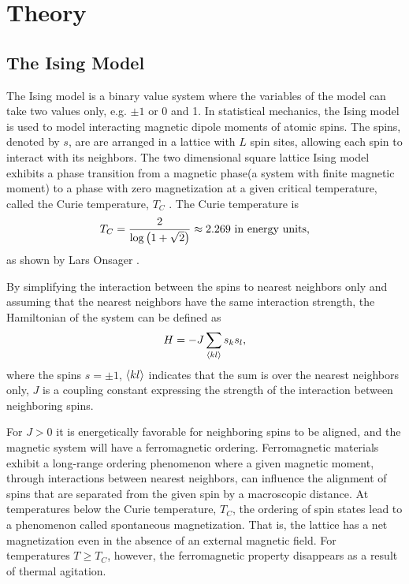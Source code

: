\section{Theory}\label{sec:Theory}

\subsection{The Ising Model}\label{sec:ising theory}
The Ising model is a binary value system where the variables of the model can take two values only, e.g. $\pm 1$ or 0 and 1. In statistical mechanics, the Ising model is used to model interacting magnetic dipole moments of atomic spins. The spins, denoted by $s$, are are arranged in a lattice with $L$ spin sites, allowing each spin to interact with its neighbors. The two dimensional square lattice Ising model exhibits a phase transition from a magnetic phase(a system with finite magnetic moment) to a phase with zero magnetization at a given critical temperature, called the Curie temperature, $T_C$ \cite{PROJising}. The Curie temperature is
\begin{equation}\label{eq:curie temp}
    T_C = \frac{2}{\log \qty(1 + \sqrt{2})} \approx 2.269 \text{ in energy units},
\end{equation}
as shown by Lars Onsager \cite{PhysRev.65.117}.

By simplifying the interaction between the spins to nearest neighbors only and assuming that the nearest neighbors have the same interaction strength, the Hamiltonian of the system can be defined as
\begin{equation}\label{eq:ising energy}
    H = - J \sum_{\ev{kl}} s_k s_l,
\end{equation}
where the spins $s=\pm 1$, $\ev{kl}$ indicates that the sum is over the nearest neighbors only, $J$ is a coupling constant expressing the strength of the interaction between neighboring spins. 

For $J>0$ it is energetically favorable for neighboring spins to be aligned, and the magnetic system will have a ferromagnetic ordering. Ferromagnetic materials exhibit a long-range ordering phenomenon where a given magnetic moment, through interactions between nearest neighbors, can influence the alignment of spins that are separated from the given spin by a macroscopic distance.
At temperatures below the Curie temperature, $T_C$, the ordering of spin states lead to a phenomenon called spontaneous magnetization. That is, the lattice has a net magnetization even in the absence of an external magnetic field. For temperatures $T\geq T_C$, however, the ferromagnetic property disappears as a result of thermal agitation. \cite{PROJising}

